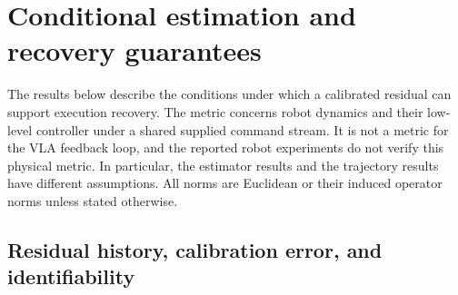 \section{Conditional estimation and recovery guarantees}
\label{app:theory}

The results below describe the conditions under which a calibrated residual can
support execution recovery. The metric concerns robot dynamics and their
low-level controller under a shared supplied command stream. It is not a
metric for the VLA feedback loop, and the reported robot experiments do not
verify this physical metric. In particular,
the estimator results and the trajectory results have different assumptions.
All norms are Euclidean or their induced operator norms unless stated otherwise.

\subsection{Residual history, calibration error, and identifiability}

